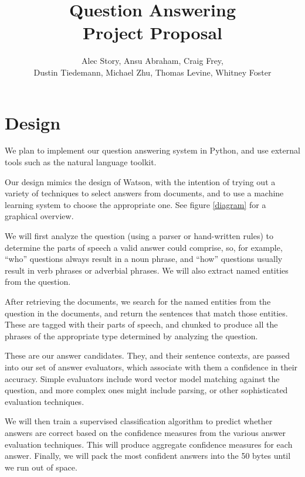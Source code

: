 \documentclass{article}
\title{Question Answering\\
\small{Project Proposal}}
\author{
Alec Story,
Ansu Abraham,
Craig Frey,\\
Dustin Tiedemann,
Michael Zhu,
Thomas Levine,
Whitney Foster\\
}
\begin{document}
\maketitle
\section{Design}

We plan to implement our question answering system in Python, and use external
tools such as the natural language toolkit.

Our design mimics the design of Watson, with the intention of trying out a
variety of techniques to select answers from documents, and to use a machine
learning system to choose the appropriate one.  See figure \ref{diagram} for
a graphical overview.

We will first analyze the question (using a parser or hand-written rules) to
determine the parts of speech a valid answer could comprise, so, for example,
``who'' questions always result in a noun phrase, and ``how'' questions usually
result in verb phrases or adverbial phrases.  We will also extract named entities
from the question.

After retrieving the documents, we search for the named entities from the
question in the documents, and return the sentences that match those entities.
These are tagged with their parts of speech, and chunked to produce all the
phrases of the appropriate type determined by analyzing the question.

These are our answer candidates.  They, and their sentence contexts, are passed
into our set of answer evaluators, which associate with them a confidence in
their accuracy.  Simple evaluators include word vector model matching against
the question, and more complex ones might include parsing, or other
sophisticated evaluation techniques.

We will then train a supervised classification algorithm to predict whether
answers are correct based on the confidence measures from the various answer
evaluation techniques. This will produce aggregate confidence measures for
each answer. Finally, we will pack the most confident answers into the 50 bytes
until we run out of space.
\end{document}

